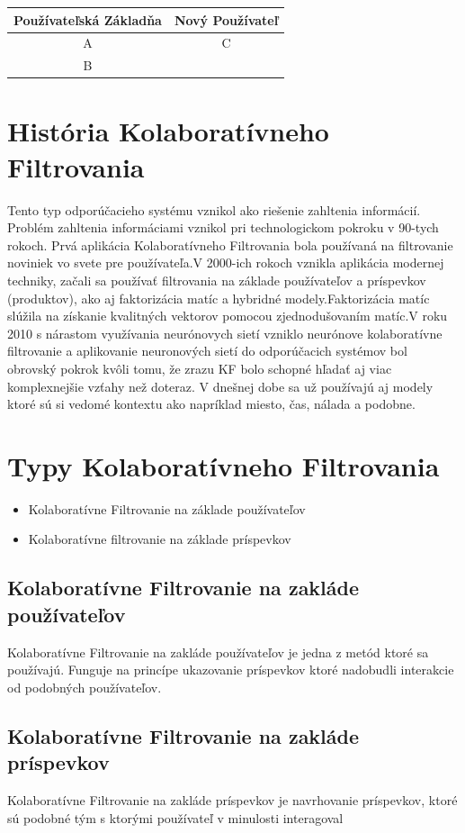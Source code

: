 \documentclass{article}
\begin{document}
\begin{table}[h!]
    \centering
    \begin{tabular}{c|c}
    Používateľská Základňa & Nový Používateľ \\
    \hline
       A  &  C \\
       B
    \end{tabular}
    \label{tab:my_label}
\end{table}
\section{História Kolaboratívneho Filtrovania}
Tento typ odporúčacieho systému vznikol ako riešenie zahltenia informácií.\\Problém zahltenia informáciami vznikol pri technologickom pokroku v 90-tych rokoch. Prvá aplikácia Kolaboratívneho Filtrovania bola používaná na filtrovanie noviniek vo svete pre používateľa.V 2000-ich rokoch vznikla aplikácia modernej techniky, začali sa používať filtrovania na základe používateľov a príspevkov (produktov), ako aj faktorizácia matíc a hybridné modely.Faktorizácia matíc slúžila na získanie kvalitných vektorov pomocou zjednodušovaním matíc.V roku 2010 s nárastom využívania neurónovych sietí 
vzniklo neurónove kolaboratívne filtrovanie a aplikovanie neuronových sietí do odporúčacich systémov bol obrovský pokrok kvôli tomu, že zrazu KF bolo schopné hľadať aj viac komplexnejšie vzťahy než doteraz. V dnešnej dobe sa už používajú aj modely ktoré sú si vedomé kontextu ako napríklad miesto, čas, nálada a podobne.
\cite{vstefancovaodporuvcanie}
\section{Typy Kolaboratívneho Filtrovania}
\begin{itemize}
    \item Kolaboratívne Filtrovanie na základe používateľov
    \item Kolaboratívne filtrovanie na základe príspevkov
\end{itemize}
\cite{tibenskypersonalizovane}
\subsection{Kolaboratívne Filtrovanie na zakláde používateľov}
Kolaboratívne Filtrovanie na zakláde používateľov je jedna z metód ktoré sa používajú. Funguje na princípe ukazovanie príspevkov ktoré nadobudli interakcie od podobných používateľov. 
\subsection{Kolaboratívne Filtrovanie na zakláde príspevkov}
Kolaboratívne Filtrovanie na zakláde príspevkov je navrhovanie príspevkov, ktoré sú podobné tým s ktorými používateľ v minulosti interagoval
\cite{vsuchova2011online}
\end{document}
